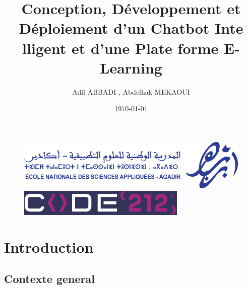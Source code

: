 \documentclass{beamer}
\author{Adil ABBADI , Abdelhak MEKAOUI}
\title{Conception, Développement et Déploiement d'un Chatbot Inte lligent et d'une Plate forme E-Learning}
\institute{ENSA Agadir}
\date{\today}
\begin{document}



\begin{frame}

  \begin{figure}[htpb]
        \begin{center}
         \includegraphics[width=0.45\linewidth]{pic/logo.png}
          \hspace{0.05\linewidth}
            \includegraphics[width=0.45\linewidth]{pic/code.png}
        \end{center}
    \end{figure}
    
    \titlepage
  
\end{frame}


\begin{frame}
    \tableofcontents[sectionstyle=show,subsectionstyle=show/shaded/hide,subsubsectionstyle=show/shaded/hide]
\end{frame}

\section{Introduction}

\subsection{Contexte general}
\end{document}
